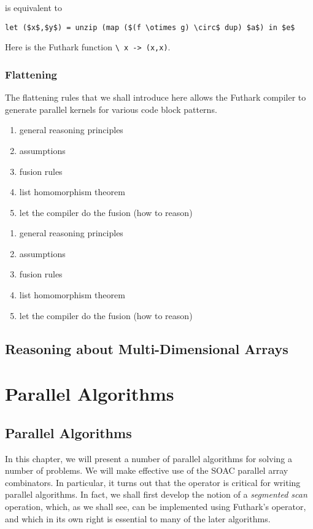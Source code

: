 \documentclass[oneside,11pt]{book}
\begin{document}
\noindent
is equivalent to

\begin{lstlisting}[mathescape=true]
  let ($x$,$y$) = unzip (map ($(f \otimes g) \circ$ dup) $a$) in $e$
\end{lstlisting}

\noindent
Here  is the Futhark function \lstinline!\ x -> (x,x)!.

\section{Flattening}

The flattening rules that we shall introduce here allows the Futhark
compiler to generate parallel kernels for various code block patterns.

\begin{enumerate}
\item general reasoning principles
\item assumptions
\item fusion rules
\item list homomorphism theorem
\item let the compiler do the fusion (how to reason)
\end{enumerate}


\begin{enumerate}
\item general reasoning principles
\item assumptions
\item fusion rules
\item list homomorphism theorem
\item let the compiler do the fusion (how to reason)
\end{enumerate}

\chapter{Reasoning about Multi-Dimensional Arrays}

\part{Parallel Algorithms}

\chapter{Parallel Algorithms}
\label{chap:parallel-algorithms}

In this chapter, we will present a number of parallel algorithms for
solving a number of problems. We will make effective use of the
SOAC parallel array combinators. In particular, it turns out that the
 operator is critical for writing parallel algorithms. In
fact, we shall first develop the notion of a \emph{segmented scan}
operation, which, as we shall see, can be implemented using Futhark's 
operator, and which in its own right is essential to many of the later
algorithms.
\end{document}
